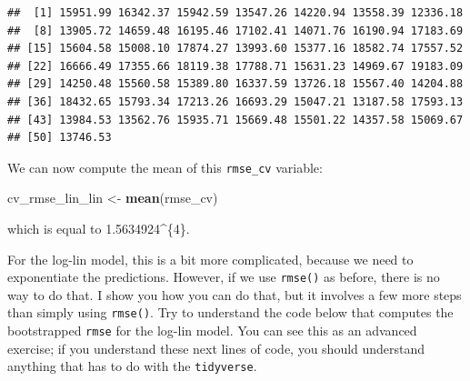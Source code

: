 \documentclass[]{gitbook}
\newenvironment{Shaded}{\begin{snugshade}}{\end{snugshade}}
\newcommand{\DataTypeTok}[1]{\textcolor[rgb]{0.13,0.29,0.53}{#1}}
\newcommand{\DecValTok}[1]{\textcolor[rgb]{0.00,0.00,0.81}{#1}}
\newcommand{\KeywordTok}[1]{\textcolor[rgb]{0.13,0.29,0.53}{\textbf{#1}}}
\newcommand{\NormalTok}[1]{#1}
\newcommand{\OperatorTok}[1]{\textcolor[rgb]{0.81,0.36,0.00}{\textbf{#1}}}
\newcommand{\OtherTok}[1]{\textcolor[rgb]{0.56,0.35,0.01}{#1}}
\newcommand{\StringTok}[1]{\textcolor[rgb]{0.31,0.60,0.02}{#1}}
\theoremstyle{definition}
\theoremstyle{definition}
\theoremstyle{definition}
\theoremstyle{remark}
\begin{document}
\begin{verbatim}
##  [1] 15951.99 16342.37 15942.59 13547.26 14220.94 13558.39 12336.18
##  [8] 13905.72 14659.48 16195.46 17102.41 14071.76 16190.94 17183.69
## [15] 15604.58 15008.10 17874.27 13993.60 15377.16 18582.74 17557.52
## [22] 16666.49 17355.66 18119.38 17788.71 15631.23 14969.67 19183.09
## [29] 14250.48 15560.58 15389.80 16337.59 13726.18 15567.40 14204.88
## [36] 18432.65 15793.34 17213.26 16693.29 15047.21 13187.58 17593.13
## [43] 13984.53 13562.76 15935.71 15669.48 15501.22 14357.58 15069.67
## [50] 13746.53
\end{verbatim}

We can now compute the mean of this \texttt{rmse\_cv} variable:

\begin{Shaded}
\begin{Highlighting}[]
\NormalTok{cv_rmse_lin_lin <-}\StringTok{ }\KeywordTok{mean}\NormalTok{(rmse_cv)}
\end{Highlighting}
\end{Shaded}

which is equal to 1.5634924\^{}\{4\}.

For the log-lin model, this is a bit more complicated, because we need
to exponentiate the predictions. However, if we use \texttt{rmse()} as
before, there is no way to do that. I show you how you can do that, but
it involves a few more steps than simply using \texttt{rmse()}. Try to
understand the code below that computes the bootstrapped \texttt{rmse}
for the log-lin model. You can see this as an advanced exercise; if you
understand these next lines of code, you should understand anything that
has to do with the \texttt{tidyverse}.

\begin{Shaded}
\end{Shaded}
\end{document}
